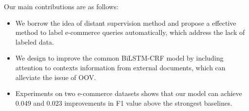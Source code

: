 

Our main contributions are as follows:
\begin{itemize}
	\item We borrow the idea of distant supervision method and propose a effective method to label e-commerce queries automatically, which address the lack of labeled data.
	\item We design to improve the common BiLSTM-CRF model by including attention to contexts information from external documents, which can alleviate the issue of OOV.
	\item Experiments on two e-commerce datasets shows that our model can achieve 0.049 and 0.023 improvements in F1 value above the strongest baselines.
\end{itemize}



